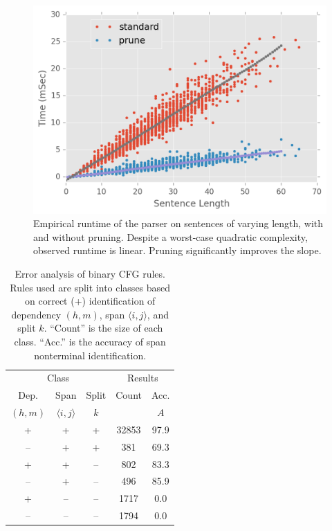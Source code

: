 \documentclass[11pt,letterpaper]{article}
\newcommand{\Span}[1]{\langle #1 \rangle}
\begin{document}
\begin{figure}
  \centering
  \includegraphics[scale=0.5]{../notebooks/comp}
  \caption{Empirical runtime of the parser on sentences of varying length, with and without pruning. 
  Despite a worst-case quadratic complexity, observed runtime is
  linear. Pruning significantly improves the slope.
\label{fig:speed}}
\end{figure}





\begin{table}
  \centering
  \footnotesize
  \begin{tabular}{|ccc|cc|}
    \hline 
    \multicolumn{3}{|c|}{Class} & \multicolumn{2}{|c|}{Results} \\
    Dep. & Span & Split & Count & Acc.  \\ 
    $(h, m)$ & $\Span{i,j}$ & $k$ &  & $A$ \\ 
    \hline
    + & + & +  &  32853 &  97.9   \\ 
    -- & + & +  &  381 & 69.3   \\ 
    + & + & --  &  802   & 83.3   \\ 
    -- & + & --  &  496 & 85.9   \\ 
    + & -- & --  &  1717 & 0.0    \\ 
    -- & -- & --  &  1794 & 0.0    \\ 
    \hline
  \end{tabular}
  \label{tab:analysis}
  \caption{Error analysis of binary CFG rules. Rules used are split into classes based on 
    correct (+) identification of dependency $(h,m)$, span $\Span{i,j}$, and split $k$. 
    ``Count'' is the size of each class. ``Acc.'' is the accuracy of span nonterminal identification.
  }
\end{table}
\end{document}
